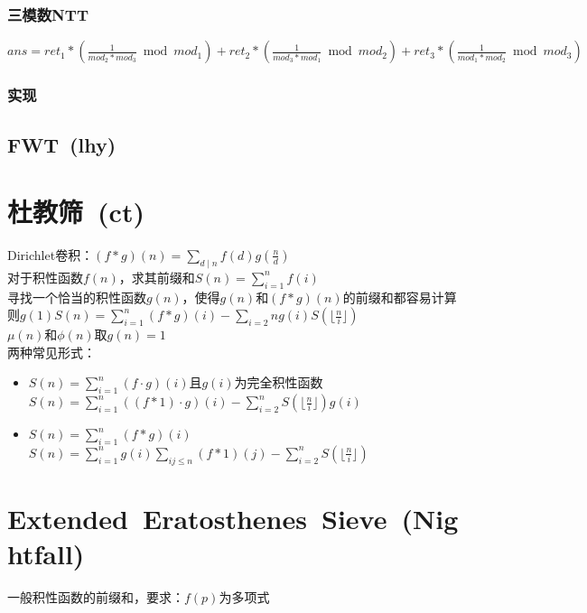         \subsubsection*{三模数NTT}
            $ ans = ret_1 * (\frac{1}{mod_2 * mod_3} \bmod mod_1) + ret_2 * (\frac{1}{mod_3 * mod_1} \bmod mod_2) + ret_3 * (\frac{1}{mod_1 * mod_2} \bmod mod_3) $
        \subsubsection*{实现}
    \subsection*{FWT\ \small(lhy)}
\section{杜教筛\ \small(ct)}
    \noindent Dirichlet卷积：$ (f \ast g) (n) = \sum\limits_{d \mid n}^{} f(d) g(\frac{n}{d}) $
    \\对于积性函数$ f(n) $，求其前缀和$ S(n) = \sum\limits_{i = 1}^{n} f(i) $
    \\寻找一个恰当的积性函数$ g(n) $，使得$ g(n) $和$ (f \ast g) (n) $的前缀和都容易计算
    \\则$ g(1) S(n) = \sum\limits_{i = 1}^{n} (f \ast g) (i) - \sum\limits_{i = 2}{n} g(i) S(\lfloor \frac{n}{i} \rfloor) $
    \\$ \mu (n) $和$ \phi (n) $取$ g(n) = 1 $
    \\两种常见形式：
    \begin{itemize}[wide=0pt]
        \item $ S(n) = \sum\limits_{i = 1}^{n} (f \cdot g) (i) $且$ g(i) $为完全积性函数
            \\$ S(n) = \sum\limits_{i = 1}^{n} ((f \ast 1) \cdot g) (i) - \sum\limits_{i = 2}^{n} S(\lfloor \frac{n}{i} \rfloor) g(i) $
        \item $ S(n) = \sum\limits_{i = 1}^{n} (f \ast g) (i) $
            \\$ S(n) = \sum\limits_{i = 1}^{n} g (i) \sum\limits_{ij \leq n}^{} (f \ast 1) (j) - \sum\limits_{i = 2}^{n} S(\lfloor \frac{n}{i} \rfloor) $
    \end{itemize}
\section{Extended\ Eratosthenes\ Sieve\ \small(Nightfall)}
    一般积性函数的前缀和，要求：$ f(p) $为多项式
